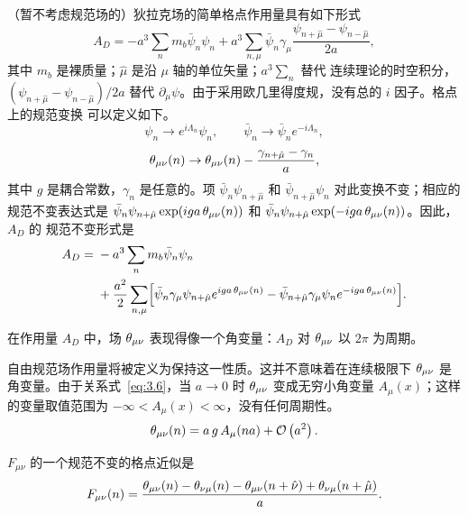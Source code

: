 （暂不考虑规范场的）狄拉克场的简单格点作用量具有如下形式
\begin{equation}
A_{D} = -a^{3}\sum_{n} m_{b}\bar\psi_{n}\psi_{n}
        + a^{3}\sum_{n,\mu} \bar\psi_{n}\gamma_{\mu}
          \frac{\psi_{n+\hat\mu}-\psi_{n-\hat\mu}}{2a},
\label{eq:3.1}
\end{equation}
其中 $m_{b}$ 是裸质量；$\hat\mu$ 是沿 $\mu$ 轴的单位矢量；$a^{3}\sum_{n}$ 替代
连续理论的时空积分，$(\psi_{n+\hat\mu}-\psi_{n-\hat\mu})/2a$ 替代
$\partial_{\mu}\psi$。由于采用欧几里得度规，没有总的 $i$ 因子。格点上的规范变换
可以定义如下。
\begin{equation}
\psi_{n} \to e^{i\Lambda_{n}}\psi_{n},\qquad
\bar\psi_{n} \to \bar\psi_{n}e^{-i\Lambda_{n}},
\label{eq:3.2}
\end{equation}
\begin{equation}
\theta_{\mu\nu}(n) \to \theta_{\mu\nu}(n) - \frac{\gamma_{n+\hat\mu}-\gamma_{n}}{a},
\label{eq:3.3}
\end{equation}
其中 $g$ 是耦合常数，$\gamma_{n}$ 是任意的。项 $\bar\psi_{n}\psi_{n+\hat\mu}$
和 $\bar\psi_{n+\hat\mu}\psi_{n}$ 对此变换不变；相应的规范不变表达式是
$\bar\psi_{n}\psi_{n+\hat\mu}\exp(iga\,\theta_{\mu\nu}(n))$ 和
$\bar\psi_{n}\psi_{n+\hat\mu}\exp(-iga\,\theta_{\mu\nu}(n))$。因此，$A_{D}$ 的
规范不变形式是
\begin{equation}
\begin{split}
A_{D} = {} & -a^{3}\sum_{n} m_{b}\bar\psi_{n}\psi_{n}\\
           & + \frac{a^{2}}{2}\sum_{n,\mu}
             \Bigl[\bar\psi_{n}\gamma_{\mu}\psi_{n+\hat\mu}
             e^{iga\,\theta_{\mu\nu}(n)}
             -\bar\psi_{n+\hat\mu}\gamma_{\mu}\psi_{n}
             e^{-iga\,\theta_{\mu\nu}(n)}\Bigr].
\end{split}
\label{eq:3.5}
\end{equation}

在作用量 $A_{D}$ 中，场 $\theta_{\mu\nu}$ 表现得像一个角变量：$A_{D}$ 对
$\theta_{\mu\nu}$ 以 $2\pi$ 为周期。

自由规范场作用量将被定义为保持这一性质。这并不意味着在连续极限下
$\theta_{\mu\nu}$ 是角变量。由于关系式~\eqref{eq:3.6}，当 $a \to 0$ 时
$\theta_{\mu\nu}$ 变成无穷小角变量 $A_{\mu}(x)$；这样的变量取值范围为
$-\infty < A_{\mu}(x) < \infty$，没有任何周期性。
\begin{equation}
\theta_{\mu\nu}(n) = a\,g\,A_{\mu}(na) + \mathcal{O}\left(a^{2}\right).
\label{eq:3.6}
\end{equation}

$F_{\mu\nu}$ 的一个规范不变的格点近似是
\begin{equation}
F_{\mu\nu}(n) =
\frac{\theta_{\mu\nu}(n)-\theta_{\nu\mu}(n)-\theta_{\mu\nu}(n+\hat\nu)
+\theta_{\nu\mu}(n+\hat\mu)}{a}.
\label{eq:3.7}
\end{equation}

